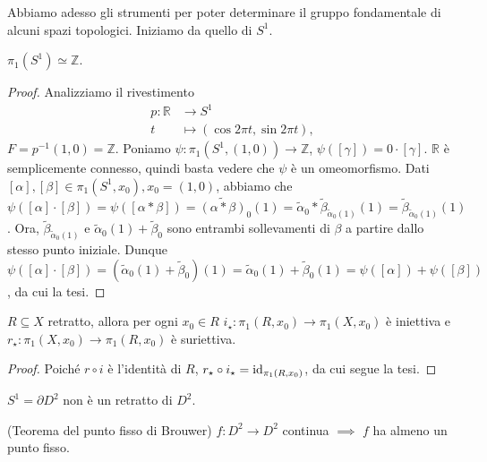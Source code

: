 Abbiamo adesso gli strumenti per poter determinare il gruppo fondamentale di alcuni spazi topologici. Iniziamo da quello di $S^1$.

\begin{thm}
  $\pi_1(S^1) \simeq \mathbb{Z}$.
\end{thm}

\begin{proof}
  Analizziamo il rivestimento
  \begin{align*}
    p: \mathbb{R} &\longrightarrow S^1 \\
    t &\longmapsto (\cos{2\pi t}, \sin{2\pi t}),
  \end{align*}
  $F=p^{-1}(1, 0)=\mathbb{Z}$. Poniamo $\psi:\pi_1(S^1, (1, 0)) \longrightarrow \mathbb{Z}$, $\psi([\gamma])=0 \cdot [\gamma]$. $\mathbb{R}$ è semplicemente connesso, quindi basta vedere che $\psi$ è un omeomorfismo.
  Dati $[\alpha], [\beta] \in \pi_1(S^1, x_0), x_0=(1, 0)$,
  abbiamo che $\psi([\alpha] \cdot [\beta])=\psi([\alpha * \beta])=\widetilde{(\alpha * \beta)}_0(1)=\tilde{\alpha}_0*\tilde{\beta}_{\tilde{\alpha}_0(1)}(1)=\tilde{\beta}_{\tilde{\alpha}_0(1)}(1)$.
  Ora, $\tilde{\beta}_{\tilde{\alpha}_0(1)}$ e $\tilde{\alpha}_0(1)+\tilde{\beta}_0$ sono entrambi sollevamenti di $\beta$ a partire dallo stesso punto iniziale.
  Dunque $\psi([\alpha] \cdot [\beta])=(\tilde{\alpha}_0(1)+\tilde{\beta}_0)(1)=\tilde{\alpha}_0(1)+\tilde{\beta}_0(1)=\psi([\alpha])+\psi([\beta])$, da cui la tesi.
\end{proof}

\begin{prop}
  $R \subseteq X$ retratto, allora per ogni $x_0 \in R$ $i_{\star}: \pi_1(R, x_0) \longrightarrow \pi_1(X, x_0)$ è iniettiva e $r_{\star}: \pi_1(X, x_0) \longrightarrow \pi_1(R, x_0)$ è suriettiva.
\end{prop}

\begin{proof}
  Poiché $r \circ i$ è l'identità di $R$, $r_{\star} \circ i_{\star}=\operatorname{id}_{\pi_1(R, x_0)}$, da cui segue la tesi.
\end{proof}

\begin{cor}
  $S^1=\partial D^2$ non è un retratto di $D^2$.
\end{cor}

\begin{thm}
  (Teorema del punto fisso di Brouwer) $f:D^2 \longrightarrow D^2$ continua $\implies$ $f$ ha almeno un punto fisso.
\end{thm}


